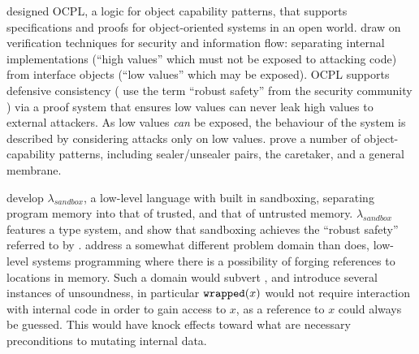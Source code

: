 {%

\cite{ddd}  designed OCPL, a logic
for object capability patterns, that supports specifications and
proofs for object-oriented systems in an open world.  
draw on verification techniques for security and
information flow: separating internal implementations (``high values''
which must not be exposed to attacking code) from interface objects
(``low values'' which may be exposed).  OCPL supports defensive
consistency %
( use the term ``robust safety'' from the
security community \cite{Bengtson}) via a proof system that ensures
low values can never leak high values to external attackers. 
As low values \textit{can} be exposed,
 the behaviour of the system is described by considering attacks only
on low values.  %
prove a number of object-capability patterns, including
sealer/unsealer pairs, the caretaker, and a general membrane.

\cite{sandbox} develop $\lambda_{sandbox}$, a low-level language with 
built in sandboxing, separating program memory into that of trusted, and
that of untrusted memory. $\lambda_{sandbox}$ features a type system,
and \citeauthor{sandbox} show that sandboxing achieves the ``robust safety'' 
referred to by \cite{ddd}. \citeauthor{sandbox} address a somewhat different
problem domain than \Chainmail does, low-level systems programming where 
there is a possibility of forging references to locations in memory. Such a domain
would subvert \Chainmail, and introduce several instances of unsoundness, in particular
$\texttt{wrapped}( x )$ would not require interaction with internal code in order to 
gain access to $x$, as a reference to $x$ could always be guessed. This would 
have knock effects toward what are necessary preconditions to mutating internal
data.

}
